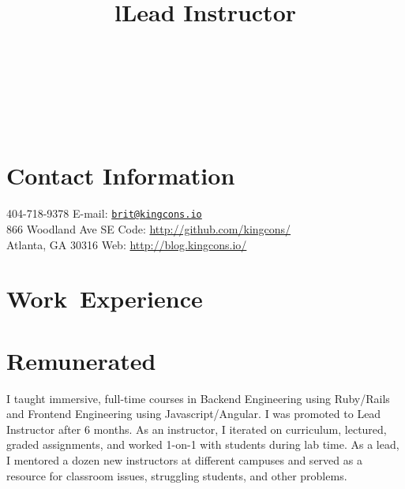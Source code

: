 \documentclass[margintitle,line]{res}
\renewcommand{\subsection}[1]{\section{\normalfont #1}}
\begin{document}

\begin{resume}

\begin{format}
\\
\title{l}\\
\body\\
\end{format}



\section{Contact Information}

404-718-9378 \hfill {E-mail:} \href{mailto:brit@kingcons.io}{\nolinkurl{brit@kingcons.io}} \\
866 Woodland Ave SE \hfill {Code:} \url{http://github.com/kingcons/} \\
Atlanta, GA 30316 \hfill {Web:} \url{http://blog.kingcons.io/} \\


\section{\mbox{Work Experience}}

\subsection{Remunerated}

\title{Lead Instructor}
\begin{position}
  I taught immersive, full-time courses in Backend Engineering using Ruby/Rails and Frontend Engineering using Javascript/Angular.
  I was promoted to Lead Instructor after 6 months. As an instructor, I iterated
  on curriculum, lectured, graded assignments, and worked 1-on-1 with students
  during lab time. As a lead, I mentored a dozen new instructors at different
  campuses and served as a resource for classroom issues, struggling students,
  and other problems.
\end{position}


\end{resume}
\end{document}
